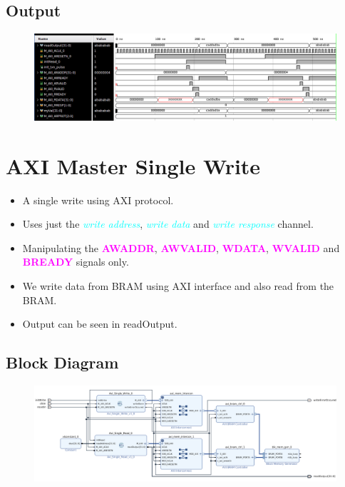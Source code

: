 \documentclass{article}
\newcommand{\chFormat}[1]{\emph{\textcolor{cyan}{#1}}}
\newcommand{\AXISignals}[1]{\textbf{\textcolor{magenta}{#1}}}
\begin{document}
\subsection{Output}
\begin{figure}[H]
    \centering
    \includegraphics[width=1\textwidth]{Resources/SingleReadBRAMoutput.png}
\end{figure}


\section{AXI Master Single Write}
\begin{itemize}
    \item A single write using AXI protocol.
    \item Uses just the \chFormat{write address}, \chFormat{write data} and \chFormat{write response} channel.
    \item Manipulating the \AXISignals{AWADDR}, \AXISignals{AWVALID}, \AXISignals{WDATA}, \AXISignals{WVALID} and \AXISignals{BREADY} signals only.
    \item We write data from BRAM using AXI interface and also read from the BRAM.
    \item Output can be seen in readOutput.
\end{itemize}
\subsection{Block Diagram}
\begin{figure}[H]
    \centering
    \includegraphics[width=1\textwidth]{Resources/SingleWriteBRAM.png}
\end{figure}
\end{document}
